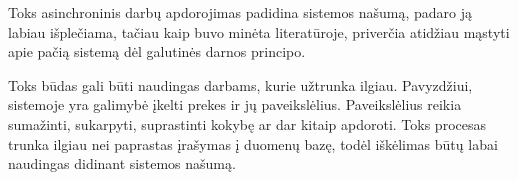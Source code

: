 Toks asinchroninis darbų apdorojimas padidina sistemos našumą, padaro ją labiau išplečiama, tačiau kaip buvo minėta literatūroje, priverčia atidžiau mąstyti apie pačią sistemą dėl galutinės darnos principo.

Toks būdas gali būti naudingas darbams, kurie užtrunka ilgiau. Pavyzdžiui, sistemoje yra galimybė įkelti prekes ir jų paveikslėlius. Paveikslėlius reikia sumažinti, sukarpyti, suprastinti kokybę ar dar kitaip apdoroti. Toks procesas trunka ilgiau nei paprastas įrašymas į duomenų bazę, todėl iškėlimas būtų labai naudingas didinant sistemos našumą.







